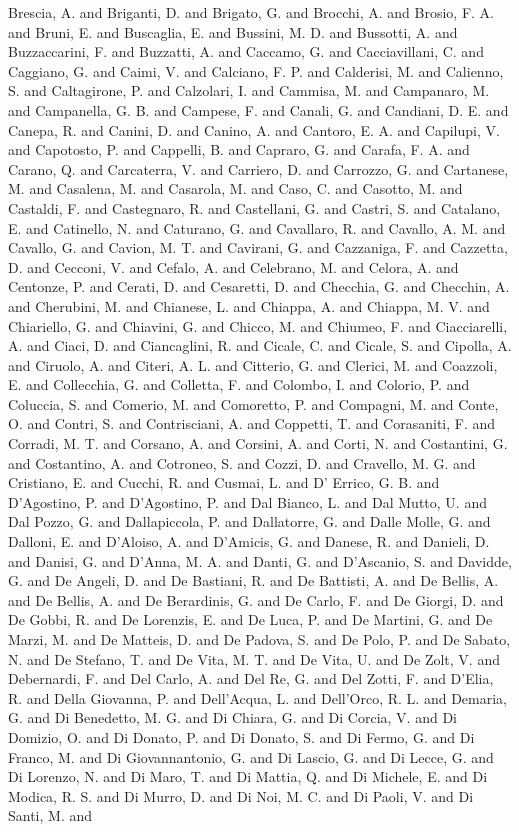 {{{{Brescia, A.  and Briganti, D.  and Brigato, G.  and Brocchi, A.  and Brosio, F. A.  and Bruni, E.  and Buscaglia, E.  and Bussini, M. D.  and Bussotti, A.  and Buzzaccarini, F.  and Buzzatti, A.  and Caccamo, G.  and Cacciavillani, C.  and Caggiano, G.  and Caimi, V.  and Calciano, F. P.  and Calderisi, M.  and Calienno, S.  and Caltagirone, P.  and Calzolari, I.  and Cammisa, M.  and Campanaro, M.  and Campanella, G. B.  and Campese, F.  and Canali, G.  and Candiani, D. E.  and Canepa, R.  and Canini, D.  and Canino, A.  and Cantoro, E. A.  and Capilupi, V.  and Capotosto, P.  and Cappelli, B.  and Capraro, G.  and Carafa, F. A.  and Carano, Q.  and Carcaterra, V.  and Carriero, D.  and Carrozzo, G.  and Cartanese, M.  and Casalena, M.  and Casarola, M.  and Caso, C.  and Casotto, M.  and Castaldi, F.  and Castegnaro, R.  and Castellani, G.  and Castri, S.  and Catalano, E.  and Catinello, N.  and Caturano, G.  and Cavallaro, R.  and Cavallo, A. M.  and Cavallo, G.  and Cavion, M. T.  and Cavirani, G.  and Cazzaniga, F.  and Cazzetta, D.  and Cecconi, V.  and Cefalo, A.  and Celebrano, M.  and Celora, A.  and Centonze, P.  and Cerati, D.  and Cesaretti, D.  and Checchia, G.  and Checchin, A.  and Cherubini, M.  and Chianese, L.  and Chiappa, A.  and Chiappa, M. V.  and Chiariello, G.  and Chiavini, G.  and Chicco, M.  and Chiumeo, F.  and Ciacciarelli, A.  and Ciaci, D.  and Ciancaglini, R.  and Cicale, C.  and Cicale, S.  and Cipolla, A.  and Ciruolo, A.  and Citeri, A. L.  and Citterio, G.  and Clerici, M.  and Coazzoli, E.  and Collecchia, G.  and Colletta, F.  and Colombo, I.  and Colorio, P.  and Coluccia, S.  and Comerio, M.  and Comoretto, P.  and Compagni, M.  and Conte, O.  and Contri, S.  and Contrisciani, A.  and Coppetti, T.  and Corasaniti, F.  and Corradi, M. T.  and Corsano, A.  and Corsini, A.  and Corti, N.  and Costantini, G.  and Costantino, A.  and Cotroneo, S.  and Cozzi, D.  and Cravello, M. G.  and Cristiano, E.  and Cucchi, R.  and Cusmai, L.  and D' Errico, G. B.  and D'Agostino, P.  and D'Agostino, P.  and Dal Bianco, L.  and Dal Mutto, U.  and Dal Pozzo, G.  and Dallapiccola, P.  and Dallatorre, G.  and Dalle Molle, G.  and Dalloni, E.  and D'Aloiso, A.  and D'Amicis, G.  and Danese, R.  and Danieli, D.  and Danisi, G.  and D'Anna, M. A.  and Danti, G.  and D'Ascanio, S.  and Davidde, G.  and De Angeli, D.  and De Bastiani, R.  and De Battisti, A.  and De Bellis, A.  and De Bellis, A.  and De Berardinis, G.  and De Carlo, F.  and De Giorgi, D.  and De Gobbi, R.  and De Lorenzis, E.  and De Luca, P.  and De Martini, G.  and De Marzi, M.  and De Matteis, D.  and De Padova, S.  and De Polo, P.  and De Sabato, N.  and De Stefano, T.  and De Vita, M. T.  and De Vita, U.  and De Zolt, V.  and Debernardi, F.  and Del Carlo, A.  and Del Re, G.  and Del Zotti, F.  and D'Elia, R.  and Della Giovanna, P.  and Dell'Acqua, L.  and Dell'Orco, R. L.  and Demaria, G.  and Di Benedetto, M. G.  and Di Chiara, G.  and Di Corcia, V.  and Di Domizio, O.  and Di Donato, P.  and Di Donato, S.  and Di Fermo, G.  and Di Franco, M.  and Di Giovannantonio, G.  and Di Lascio, G.  and Di Lecce, G.  and Di Lorenzo, N.  and Di Maro, T.  and Di Mattia, Q.  and Di Michele, E.  and Di Modica, R. S.  and Di Murro, D.  and Di Noi, M. C.  and Di Paoli, V.  and Di Santi, M.  and }}}}
